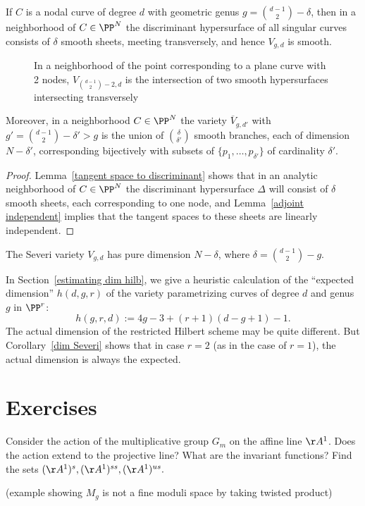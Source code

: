 \begin{corollary}\label{local geometry of Severi}
If $C$ is a nodal curve of degree $d$ with geometric genus $g = \binom{d-1}{2}-\delta$, then in a neighborhood of $C\in \PP^N$
the discriminant hypersurface of all singular curves consists of $\delta$ smooth sheets, meeting transversely, and hence
$V_{g,d}$ is smooth. 

\begin{figure}
 \caption{In a neighborhood of the point corresponding to a plane curve with 2 nodes, $V_{\binom{d-1}{2}-2, d}$ is the intersection of two smooth hypersurfaces intersecting transversely}
\end{figure}

Moreover, in a neighborhood  $C \in \PP^N$ 
the variety $\overline V_{g,d'}$ with $g' =  \binom{d-1}{2}-\delta' > g$ is the union of $\binom{\delta}{\delta'}$ smooth branches, each of dimension $N - \delta'$, corresponding bijectively with subsets of $\{p_1,\dots,p_{\delta'}\}$ of cardinality $\delta'$.
\end{corollary}
\begin{proof}
Lemma~\ref{tangent space to discriminant} shows that in an analytic neighborhood of $C\in \PP^N$ the discriminant hypersurface $\Delta$ will consist of $\delta$ smooth sheets, each corresponding to one node, and Lemma~\ref{adjoint independent} implies that the tangent spaces to these sheets are linearly independent. 
\end{proof}


\begin{corollary}\label{dim Severi}
The  Severi variety $V_{g,d}$ has pure dimension $N - \delta$, where $\delta = \binom{d-1}{2} - g$.
\end{corollary}

In Section~\ref{estimating dim hilb}, we give a heuristic calculation of the ``expected dimension'' $h(d,g,r)$ of the variety parametrizing curves of degree $d$ and genus $g$ in $\PP^r$:
$$
h(g,r,d) := 4g-3 + (r+1)(d-g+1) - 1.
$$
The actual dimension of the restricted Hilbert scheme may be quite different. But  Corollary~\ref{dim Severi} shows that in case $r=2$ (as in the case of $r=1$), the actual dimension is always the expected.



\section{Exercises}

\begin{exercise}
Consider the action of the multiplicative group $G_m$ on the affine line $\AA^1$. Does the action extend
to the projective line? What are the invariant functions? Find the sets $(\AA^1)^s, (\AA^1)^{ss}, (\AA^1)^{us}.$
\end{exercise}

\begin{exercise}
(example showing $M_g$ is not a fine moduli space by taking twisted product)
\end{exercise}


